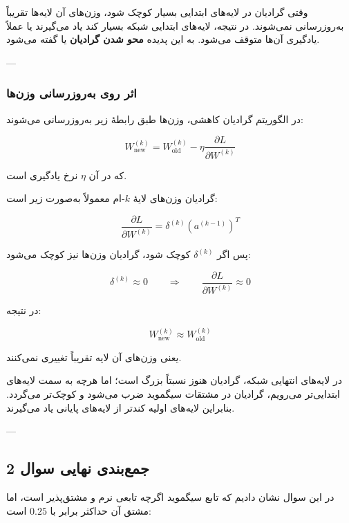 \documentclass[12pt,a4paper]{article}
\begin{document}
\begin{tcolorbox}[
	colback=softpink,
	colframe=softred,
	title=مفهوم محو شدن گرادیان
	]
	وقتی گرادیان در لایه‌های ابتدایی بسیار کوچک شود، وزن‌های آن لایه‌ها تقریباً به‌روزرسانی نمی‌شوند. در نتیجه، لایه‌های ابتدایی شبکه بسیار کند یاد می‌گیرند یا عملاً یادگیری آن‌ها متوقف می‌شود. به این پدیده \textbf{محو شدن گرادیان} یا  گفته می‌شود.
\end{tcolorbox}

---

\subsubsection{اثر روی به‌روزرسانی وزن‌ها}

در الگوریتم گرادیان کاهشی، وزن‌ها طبق رابطهٔ زیر به‌روزرسانی می‌شوند:

\[
W^{(k)}_{\text{new}}
=
W^{(k)}_{\text{old}}
-
\eta
\frac{\partial L}{\partial W^{(k)}}
\]

که در آن \(\eta\) نرخ یادگیری است.

گرادیان وزن‌های لایهٔ \(k\)-ام معمولاً به‌صورت زیر است:

\[
\frac{\partial L}{\partial W^{(k)}}
=
\delta^{(k)}
\left(a^{(k-1)}\right)^T
\]

پس اگر \(\delta^{(k)}\) کوچک شود، گرادیان وزن‌ها نیز کوچک می‌شود:

\[
\delta^{(k)} \approx 0
\qquad\Longrightarrow\qquad
\frac{\partial L}{\partial W^{(k)}} \approx 0
\]

در نتیجه:

\[
W^{(k)}_{\text{new}}
\approx
W^{(k)}_{\text{old}}
\]

یعنی وزن‌های آن لایه تقریباً تغییری نمی‌کنند.

\begin{tcolorbox}[
	colback=lightblue,
	colframe=mainblue,
	title=تحلیل نهایی اثر روی یادگیری
	]
	در لایه‌های انتهایی شبکه، گرادیان هنوز نسبتاً بزرگ است؛ اما هرچه به سمت لایه‌های ابتدایی‌تر می‌رویم، گرادیان در مشتقات سیگموید ضرب می‌شود و کوچک‌تر می‌گردد. بنابراین لایه‌های اولیه کندتر از لایه‌های پایانی یاد می‌گیرند.
\end{tcolorbox}

---

\subsection{جمع‌بندی نهایی سوال 2}

در این سوال نشان دادیم که تابع سیگموید اگرچه تابعی نرم و مشتق‌پذیر است، اما مشتق آن حداکثر برابر با \(0.25\) است:
\end{document}
